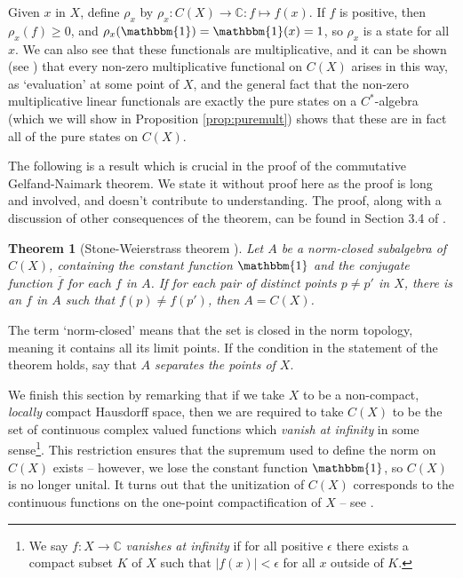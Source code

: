 \documentclass[11pt,a4paper]{report}
\theoremstyle{plain}
\newtheorem*{thm*}{Theorem}
\theoremstyle{definition}
\newcommand{\1}{\mathbbm{1}}
\newcommand{\C}{\mathbb{C}}
\newcommand{\CX}{C(X)}
\renewcommand{\bar}{\overline}
\begin{document}
Given $x$ in $X$, define $\rho_x$ by $\rho_x:\CX\to\C:f\mapsto f(x)$. If $f$ is positive, then 
$\rho_x(f) \geq 0$, and $\rho_x(\1) = \1(x)=1$, so $\rho_x$ is a state for all $x$. We can also see that 
these functionals are multiplicative, and it can be shown (see \cite[Corollary 3.4.2]{kadison83}) that 
every non-zero multiplicative functional on $\CX$ arises in this way, as `evaluation' at some point of 
$X$, and the general fact that the non-zero multiplicative linear functionals are exactly the pure 
states on a $C^\ast$-algebra (which we will show in Proposition \ref{prop:puremult}) shows that these 
are in fact all of the pure states on $\CX$.

The following is a result which is crucial in the proof of the commutative Gelfand-Naimark theorem. We 
state it without proof here as the proof is long and involved, and doesn't contribute to understanding. 
The proof, along with a discussion of other consequences of the theorem, can be found in Section 3.4 of 
\cite{kadison83}.

\begin{thm*}[Stone-Weierstrass theorem {\cite[3.4.15]{kadison83}}]
	Let $A$ be a norm-closed subalgebra of $\CX$, containing the constant function $\1$ and the 
	conjugate function $\bar f$ for each $f$ in $A$. If for each pair of distinct points $p\not=p'$ in 
	$X$, there is an $f$ in $A$ such that $f(p)\not=f(p')$, then $A=\CX$.
\end{thm*}

The term `norm-closed' means that the set is closed in the norm topology, meaning it contains all its 
limit points. If the condition in the statement of the theorem holds, say that \emph{$A$ separates the 
points of $X$}.

We finish this section by remarking that if we take $X$ to be a non-compact, \emph{locally} compact 
Hausdorff space, then we are required to take $\CX$ to be the set of continuous complex valued functions 
which \emph{vanish at infinity} in some sense\footnote
{We say $f:X\to\C$ \emph{vanishes at infinity} if for all positive $\epsilon$ there exists a compact 
subset $K$ of $X$ such that $\left|f(x)\right|<\epsilon$ for all $x$ outside of $K$.}. This restriction ensures 
that the supremum used to define the norm on $\CX$ exists -- however, we lose the constant function 
$\1$, so $\CX$ is no longer unital. 
It turns out that the unitization of $\CX$ corresponds to the continuous functions on the one-point 
compactification of $X$ -- see \cite[II.1.2.2]{blackadar06}.
\end{document}
